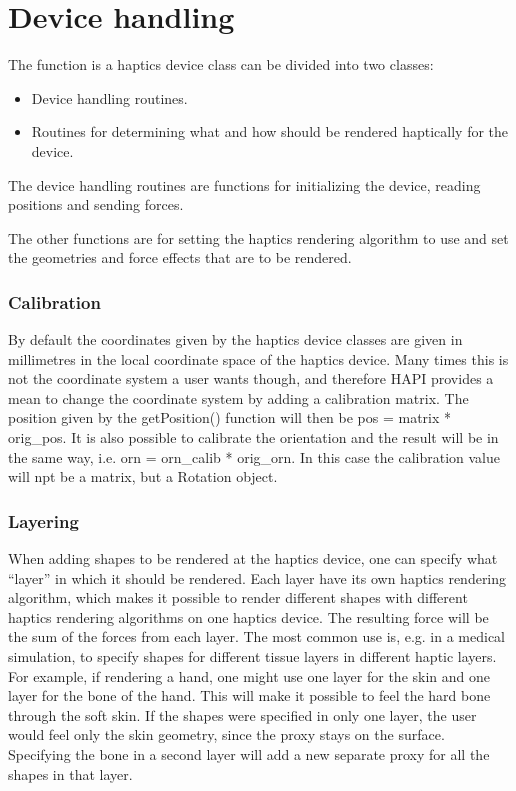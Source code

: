 
\chapter {Device handling}

The function is a haptics device class can be divided into two classes:

\begin{itemize}
\item Device handling routines.
\item Routines for determining what and how should be rendered haptically
for the device. 
\end{itemize}

The device handling routines are functions for initializing the
device, reading positions and sending forces. 

The other functions are for setting the haptics rendering algorithm
to use and set the geometries and force effects that are to be
rendered.

\subsection{Calibration}
By default the coordinates given by the haptics device classes are
given in millimetres in the local coordinate space of the haptics
device. Many times this is not the coordinate system a user wants
though, and therefore HAPI provides a mean to change the coordinate
system by adding a calibration matrix. The position given by the
getPosition() function will then be pos = matrix * orig_pos. It is
also possible to calibrate the orientation and the result will be in
the same way, i.e. orn = orn_calib * orig_orn. In this case the
calibration value will npt be a matrix, but a Rotation object.

\subsection{Layering}
When adding shapes to be rendered at the haptics device, one can
specify what ``layer'' in which it should be rendered. Each layer have
its own haptics rendering algorithm, which makes it possible to render
different shapes with different haptics rendering algorithms on one
haptics device. The resulting force will be the sum of the forces from
each layer. The most common use is, e.g. in a medical simulation, to
specify shapes for different tissue layers in different haptic
layers. For example, if rendering a hand, one might use one layer for
the skin and one layer for the bone of the hand. This will make it
possible to feel the hard bone through the soft skin. If the shapes
were specified in only one layer, the user would feel only the skin
geometry, since the proxy stays on the surface. Specifying the bone in
a second layer will add a new separate proxy for all the shapes in
that layer. 

